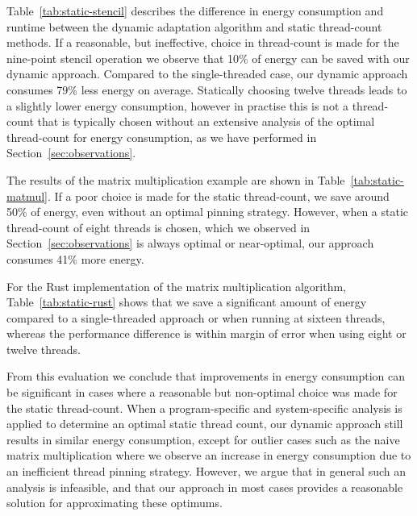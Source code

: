 Table~\ref{tab:static-stencil} describes the difference in energy consumption and runtime between the dynamic adaptation algorithm and static thread-count methods.
If a reasonable, but ineffective, choice in thread-count is made for the nine-point stencil operation we observe that 10\% of energy can be saved with our dynamic approach.
Compared to the single-threaded case, our dynamic approach consumes 79\% less energy on average.
Statically choosing twelve threads leads to a slightly lower energy consumption, however in practise this is not a thread-count that is typically chosen without an extensive analysis of the optimal thread-count for energy consumption, as we have performed in Section~\ref{sec:observations}.

The results of the matrix multiplication example are shown in Table~\ref{tab:static-matmul}.
If a poor choice is made for the static thread-count, we save around 50\% of energy, even without an optimal pinning strategy.
However, when a static thread-count of eight threads is chosen, which we observed in Section~\ref{sec:observations} is always optimal or near-optimal, our approach consumes 41\% more energy.

For the Rust implementation of the matrix multiplication algorithm, Table~\ref{tab:static-rust} shows that we save a significant amount of energy compared to a single-threaded approach or when running at sixteen threads, whereas the performance difference is within margin of error when using eight or twelve threads.

From this evaluation we conclude that improvements in energy consumption can be significant in cases where a reasonable but non-optimal choice was made for the static thread-count.
When a program-specific and system-specific analysis is applied to determine an optimal static thread count, our dynamic approach still results in similar energy consumption, except for outlier cases such as the naive matrix multiplication where we observe an increase in energy consumption due to an inefficient thread pinning strategy.
However, we argue that in general such an analysis is infeasible, and that our approach in most cases provides a reasonable solution for approximating these optimums.
